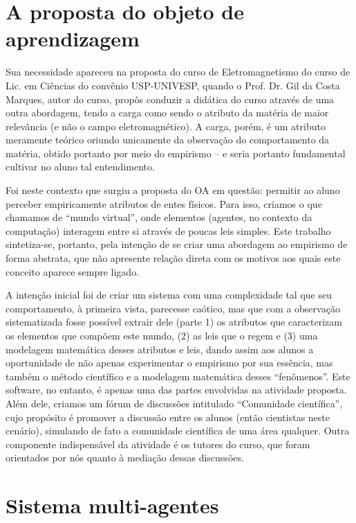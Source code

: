 \documentclass{article}
\begin{document}
\section{A proposta do objeto de aprendizagem}

Sua necessidade apareceu na proposta do curso de Eletromagnetismo do curso de Lic.
em Ciências do convênio USP-UNIVESP, quando o Prof. Dr. Gil da Costa Marques,
autor do curso, propôs conduzir a didática do curso através de uma outra abordagem,
tendo a carga como sendo o atributo da matéria de maior relevância (e não o campo
eletromagnético). A carga, porém, é um atributo meramente teórico oriundo unicamente
da observação do comportamento da matéria, obtido portanto por meio do empirismo –
e seria portanto fundamental cultivar no aluno tal entendimento.

Foi neste contexto que surgiu a proposta do OA em questão: permitir ao aluno
perceber empiricamente atributos de entes físicos. Para isso, criamos o que chamamos
de “mundo virtual”, onde elementos (agentes, no contexto da computação) interagem
entre si através de poucas leis simples. Este trabalho sintetiza-se, portanto, pela intenção
de se criar uma abordagem ao empirismo de forma abstrata, que não apresente relação
direta com os motivos aos quais este conceito aparece sempre ligado.

A intenção inicial foi de criar um sistema com uma complexidade tal que seu
comportamento, à primeira vista, parecesse caótico, mas que com a observação
sistematizada fosse possível extrair dele (parte 1) os atributos que caracterizam os
elementos que compõem este mundo, (2) as leis que o regem e (3) uma modelagem
matemática desses atributos e leis, dando assim aos alunos a oportunidade de não
apenas experimentar o empirismo por sua essência, mas também o método científico e a
modelagem matemática desses “fenômenos”. Este software, no entanto, é apenas uma
das partes envolvidas na atividade proposta. Além dele, criamos um fórum de
discussões intitulado “Comunidade científica”, cujo propósito é promover a discussão
entre os alunos (então cientistas neste cenário), simulando de fato a comunidade
científica de uma área qualquer. Outra componente indispensável da atividade é os
tutores do curso, que foram orientados por nós quanto à mediação dessas discussões.

\section{Sistema multi-agentes}
\end{document}
